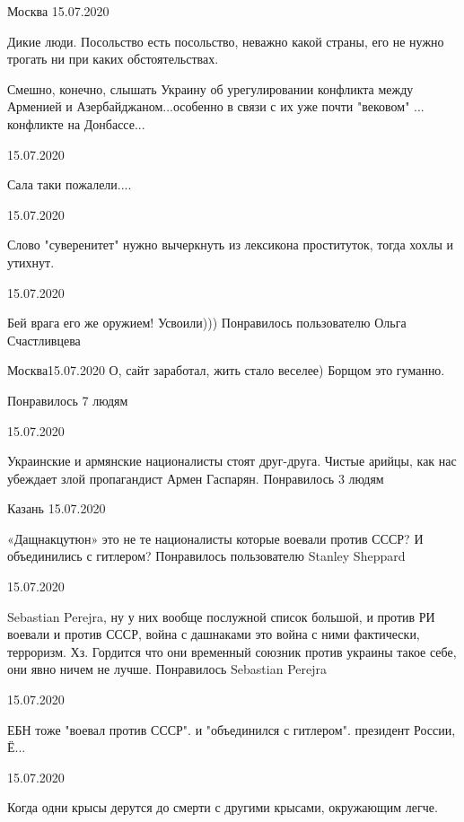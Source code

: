 \begin{itemize}
 Москва 15.07.2020  

Дикие люди. Посольство есть посольство, неважно какой страны, его не нужно
трогать ни при каких обстоятельствах.


Смешно, конечно, слышать Украину об урегулировании конфликта между Арменией и
Азербайджаном...особенно в связи с их уже почти "вековом" ... конфликте на
Донбассе...

 15.07.2020  

Сала таки пожалели....

 15.07.2020  

Слово "суверенитет" нужно вычеркнуть из лексикона проституток, тогда хохлы и утихнут.

 15.07.2020  

Бей врага его же оружием! Усвоили)))
Понравилось пользователю Ольга Счастливцева

 Москва15.07.2020  
О, сайт заработал, жить стало веселее) Борщом это гуманно.

Понравилось 7 людям

 15.07.2020  

Украинские и армянские националисты стоят друг-друга. Чистые арийцы, как нас
убеждает злой пропагандист Армен Гаспарян.
Понравилось 3 людям

 Казань 15.07.2020  

«Дащнакцутюн» это не те националисты которые воевали против СССР? И объединились с гитлером?
Понравилось пользователю Stanley Sheppard

 15.07.2020

Sebastian Perejra, ну у них вообще послужной список большой, и против РИ воевали и против СССР, война с дашнаками это война с ними фактически, терроризм. Хз. Гордится что они временный союзник против украины такое себе, они явно ничем не лучше.
Понравилось Sebastian Perejra

 15.07.2020

ЕБН тоже "воевал против СССР". и "объединился с гитлером". президент России, Ё...

 15.07.2020

Когда одни крысы дерутся до смерти с другими крысами, окружающим легче.
\end{itemize}

